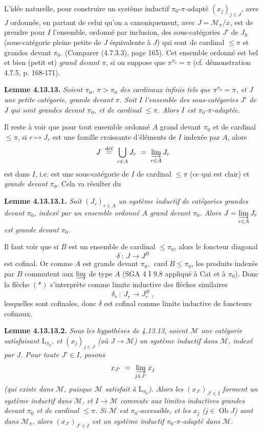 \documentclass[11pt]{article}
\newcommand{\printedpage}[1]{\marginpar{\footnotesize p.~#1}}
\newcommand{\msp}[1]{\marginpar{\footnotesize [#1]}}
\newcommand{\Ob}{\operatorname{Ob}}
\newcommand{\ilim}{\varinjlim\limits}
\begin{document}
L'idée naturelle, pour construire un système inductif $\pi_0$-$\pi$-adapté $(x_j)_{j\in J}$, avec $J$ ordonnée, en partant de celui qu'on a canoniquement, avec $J = \mathcal{M}_\pi/x$, est de prendre pour $I$ l'ensemble, ordonné par inclusion, des sous-catégories $J'$ de $J_0$ (sous-catégorie pleine petite de $J$ équivalente à $J$) qui sont de cardinal $\leqslant \pi$ et grandes devant $\pi_0$. (Comparer (4.7.3.3), page 165). Cet ensemble ordonné est bel et bien (petit et) \textit{grand devant} $\pi$, si on suppose que $\pi^{\pi_0} = \pi$ (cf. démonstration 4.7.5, p. 168-171).

\msp{page 305}\noindent\textbf{Lemme 4.13.13.} \textit{Soient $\pi_0$, $\pi > \pi_0$ des cardinaux infinis tels que $\pi^{\pi_0} = \pi$, et $J$ une petite catégorie, grande devant $\pi$. Soit $I$ l'ensemble des sous-catégories $J'$ de $J$ qui sont grandes devant $\pi_0$, et de cardinal $\leqslant \pi$. Alors $I$ est $\pi_0$-$\pi$-adaptée.}

Il reste à voir que pour tout ensemble ordonné $A$ grand devant $\pi_0$ et de cardinal $\leqslant \pi$, si $r \longmapsto J_r$ est une famille croissante d'éléments de $I$ indexée par $A$, alors
\[
J \ \overset{\text{déf}}{=} \ \bigcup_{r\in A} J_r \ = \ \varinjlim_{r\in A} J_r
\]
est dans $I$, i.e. est une sous-catégorie de $I$ de cardinal $\leqslant \pi$ (ce qui est clair) et \textit{grande devant} $\pi_0$. Cela va résulter du

\printedpage{115}

\noindent\textbf{Lemme 4.13.13.1.} \textit{Soit $(J_r)_{r\in A}$ un système inductif de catégories grandes devant $\pi_0$, indexé par un ensemble ordonné $A$ grand devant $\pi_0$. Alors $J = \ilim_{r\in A} J_r$ est grande devant $\pi_0$.}

\msp{page 306}\noindent Il faut voir que si $B$ est un ensemble de cardinal $\leqslant \pi_0$, alors le foncteur diagonal
\[
\delta \ : \ J \longrightarrow J^B \tag*{$(*)$}
\]
est cofinal. Or comme $A$ est grande devant $\pi_0$, $\operatorname{card} B \leqslant \pi_0$, les produits indexés par $B$ commutent aux $\varinjlim$ de type $A$ (SGA 4 I 9.8 appliqué à Cat et à $\pi_0$). Donc la flèche $(*)$ s'interprète comme limite inductive des flèches similaires
\[
\delta_r \ : \ J_r \longrightarrow J_r^B \ , \tag*{$(**)$}
\]
lesquelles sont cofinales, donc $\delta$ est cofinal comme limite inductive de foncteurs cofinaux.

\noindent\textbf{Lemme 4.13.13.2.} \textit{Sous les hypothèses de 4.13.13, soient $\mathcal{M}$ une catégorie satisfaisant $\mathrm{L}_{\pi_0}$, et $(x_j)_{j\in J}$ (où $J \longrightarrow \mathcal{M}$) un système inductif dans $\mathcal{M}$, indexé par $J$. Pour toute $J' \in I$, posons}
\[
x_{J'} \ = \ \varinjlim_{j\in J'} x_j
\]
\msp{page 307}\textit{(qui existe dans $\mathcal{M}$, puisque $\mathcal{M}$ satisfait à $\mathrm{L}_{\pi_0}$). Alors les $(x_{J'})_{J'\in I}$ forment un système inductif dans $\mathcal{M}$, et $I \longrightarrow \mathcal{M}$ commute aux limites inductives grandes devant $\pi_0$ et de cardinal $\leqslant \pi$. Si $\mathcal{M}$ est $\pi_0$-accessible, et les $x_j$ ($j \in \Ob J$) sont dans $\mathcal{M}_\pi$, alors $(x_{J'})_{J'\in I}$ est un système inductif $\pi_0$-$\pi$-adapté dans $\mathcal{M}$.}
\end{document}
